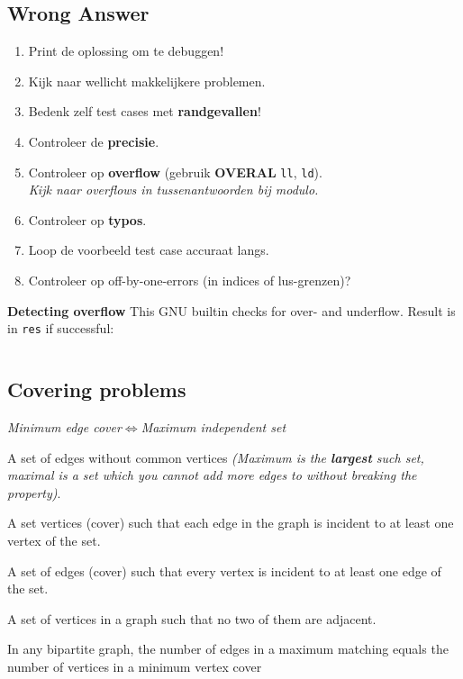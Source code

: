 \documentclass[8pt,a4paper,landscape,oneside]{amsart}
\newcommand{\mintedstyle}[2]{\inputminted[fontsize=\normalsize,baselinestretch=.9,breaklines,tabsize=2]{#1}{code/#2}}
\newcommand{\code}[1]{\mintedstyle{cpp}{#1}}
\begin{document}
\begin{multicols*}{3}
\subsection{Wrong Answer}

\begin{enumerate}
	\setlength\itemsep{-.25em}
	\item Print de oplossing om te debuggen!
	\item Kijk naar wellicht makkelijkere problemen.
	\item Bedenk zelf test cases met \textbf{randgevallen}!
	\item Controleer de \textbf{precisie}.
	\item Controleer op \textbf{overflow} (gebruik \textbf{OVERAL} \texttt{ll}, \texttt{ld}).
		\\ \textit{Kijk naar overflows in tussenantwoorden bij modulo.}
	\item Controleer op \textbf{typo\textquotesingle s}.
	\item Loop de voorbeeld test case accuraat langs.
	\item Controleer op off-by-one-errors (in indices of lus-grenzen)?
\end{enumerate}

\textbf{Detecting overflow}
This GNU builtin checks for over- and underflow. Result is in \texttt{res} if successful:
\code{other/overflow.cpp}

\subsection{Covering problems}

\begin{center}
	\emph{Minimum edge cover$\iff$Maximum independent set}
\end{center}

\begin{description}
	\setlength\itemsep{-.25em}
	\item[Matching]
		A set of edges without common vertices \textit{(Maximum is the \textbf{largest} such set, maximal is a set which you cannot add more edges to without breaking the property)}.
	\item[Minimum Vertex Cover]
		A set vertices (cover) such that each edge in the graph is incident to at least one vertex of the set.
	\item[Minimum Edge Cover]
		A set of edges (cover) such that every vertex is incident to at least one edge of the set.
	\item[Maximum Independent Set]
		A set of vertices in a graph such that no two of them are adjacent.
	\item[K\"{o}nig's theorem]
		In any bipartite graph, the number of edges in a maximum matching equals the number of vertices in a minimum vertex cover
\end{description}


\end{multicols*}
\end{document}

